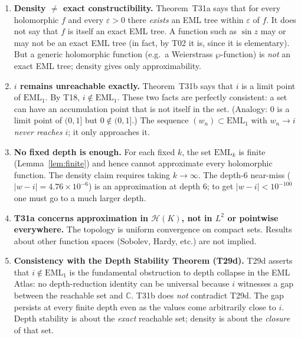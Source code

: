 \documentclass[11pt]{article}
\begin{document}
\begin{enumerate}

\item \textbf{Density $\ne$ exact constructibility.}
  Theorem~T31a says that for every holomorphic $f$ and every $\varepsilon > 0$
  there \emph{exists} an EML tree within $\varepsilon$ of $f$.  It does not say
  that $f$ is itself an exact EML tree.  A function such as $\sin z$ may or may
  not be an exact EML tree (in fact, by T02 it is, since it is elementary).
  But a generic holomorphic function (e.g.\ a Weierstrass $\wp$-function) is
  \emph{not} an exact EML tree; density gives only approximability.

\item \textbf{$i$ remains unreachable exactly.}
  Theorem~T31b says that $i$ is a limit point of $\mathrm{EML}_1$.  By T18,
  $i \notin \mathrm{EML}_1$.  These two facts are perfectly consistent: a set
  can have an accumulation point that is not itself in the set.
  (Analogy: $0$ is a limit point of $(0,1]$ but $0 \notin (0,1]$.)
  The sequence $(w_n) \subset \mathrm{EML}_1$ with $w_n \to i$ \emph{never
  reaches} $i$; it only approaches it.

\item \textbf{No fixed depth is enough.}
  For each fixed $k$, the set $\mathrm{EML}_k$ is finite (Lemma~\ref{lem:finite})
  and hence cannot approximate every holomorphic function.  The density claim
  requires taking $k \to \infty$.  The depth-6 near-miss
  ($|w - i| = 4.76 \times 10^{-6}$) is an approximation at depth 6; to get
  $|w - i| < 10^{-100}$ one must go to a much larger depth.

\item \textbf{T31a concerns approximation in $\mathcal{H}(K)$, not in $L^2$ or
  pointwise everywhere.}
  The topology is uniform convergence on compact sets.  Results about other
  function spaces (Sobolev, Hardy, etc.) are not implied.

\item \textbf{Consistency with the Depth Stability Theorem (T29d).}
  T29d asserts that $i \notin \mathrm{EML}_1$ is the fundamental obstruction to
  depth collapse in the EML Atlas: no depth-reduction identity can be universal
  because $i$ witnesses a gap between the reachable set and $\mathbb{C}$.
  T31b does \emph{not} contradict T29d.  The gap persists at every finite depth
  even as the values come arbitrarily close to $i$.  Depth stability is about
  the \emph{exact} reachable set; density is about the \emph{closure} of that set.

\end{enumerate}
\end{document}
